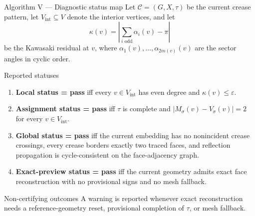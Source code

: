 \documentclass[aspectratio=169,10pt]{beamer}
\newcommand{\CP}{\mathcal{C}}
\newcommand{\eps}{\varepsilon}
\begin{document}
\begin{frame}{Algorithm V — Diagnostic status map}
\footnotesize Let \(\CP=(G,X,\tau)\) be the current crease pattern, let \(V_{\mathrm{int}}\subseteq V\) denote the interior vertices, and let
\[
\kappa(v)=\left|\sum_{i\text{ odd}}\alpha_i(v)-\pi\right|
\]
be the Kawasaki residual at \(v\), where \(\alpha_1(v),\dots,\alpha_{2m(v)}(v)\) are the sector angles in cyclic order.

\begin{block}{Reported statuses}
\begin{enumerate}\footnotesize
  \item \textbf{Local status = pass} iff every \(v\in V_{\mathrm{int}}\) has even degree and \(\kappa(v)\le \eps\).
  \item \textbf{Assignment status = pass} iff \(\tau\) is complete and \(|M_\sigma(v)-V_\sigma(v)|=2\) for every \(v\in V_{\mathrm{int}}\).
  \item \textbf{Global status = pass} iff the current embedding has no nonincident crease crossings, every crease borders exactly two traced faces, and reflection propagation is cycle-consistent on the face-adjacency graph.
  \item \textbf{Exact-preview status = pass} iff the current geometry admits exact face reconstruction with no provisional signs and no mesh fallback.
\end{enumerate}
\end{block}

\begin{alertblock}{Non-certifying outcomes}
\footnotesize A warning is reported whenever exact reconstruction needs a reference-geometry reset, provisional completion of \(\tau\), or mesh fallback.
\end{alertblock}
\end{frame}
\end{document}
